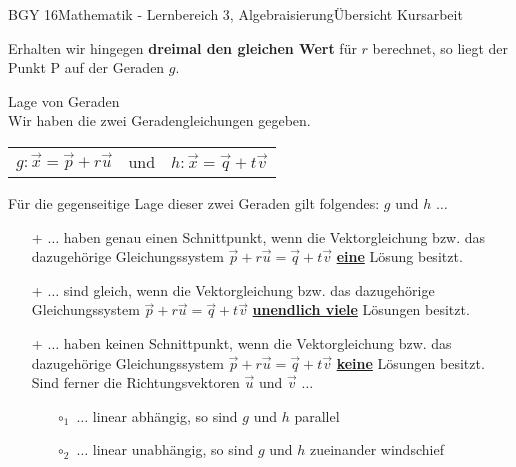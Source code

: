 \documentclass[oneside,openany,headings=optiontotoc,11pt,numbers=noenddot]{scrreprt}
\begin{document}
\begin{worksheet}{BGY 16}{Mathematik - Lernbereich 3, Algebraisierung}{Übersicht Kursarbeit}
\begin{framed}
			Erhalten wir hingegen \textbf{dreimal den gleichen Wert} für \(r\) berechnet, so liegt der Punkt P auf der Geraden \(g\).
		\end{framed}
		\begin{framed}
			\noindent
			\tiny{\color{codegray}Lage von Geraden}\normalcolor\normalsize\\
			Wir haben die zwei Geradengleichungen gegeben.
			\begin{center}
				\begin{tabularx}{\textwidth}{XlX}
					\(g: \vec{x} = \vec{p} + r\vec{u}\) & und & \(h: \vec{x} = \vec{q} + t\vec{v}\)
				\end{tabularx}
			\end{center}
			Für die gegenseitige Lage dieser zwei Geraden gilt folgendes: \(g\) und \(h\) \(\ldots\)
			\begin{framed}
				\noindent
				\begin{itemize}
					\item[+] \(\ldots\) haben \color{codegreen}genau einen\normalcolor{} Schnittpunkt, wenn die Vektorgleichung bzw. das dazugehörige Gleichungssystem \(\vec{p} + r\vec{u} = \vec{q} + t\vec{v}\) \underline{\textbf{eine}} Lösung besitzt. 
					\item[+] \(\ldots\) sind \color{codegreen}gleich\normalcolor{}, wenn die Vektorgleichung bzw. das dazugehörige Gleichungssystem \(\vec{p} + r\vec{u} = \vec{q} + t\vec{v}\) \underline{\textbf{unendlich viele}} Lösungen besitzt.
				\end{itemize}
			\end{framed}
			\begin{framed}
				\begin{itemize}
					\item[+] \(\ldots\) haben \color{red}keinen\normalcolor{} Schnittpunkt, wenn die Vektorgleichung bzw. das dazugehörige Gleichungssystem \(\vec{p} + r\vec{u} = \vec{q} + t\vec{v}\) \underline{\textbf{keine}} Lösungen besitzt.\\
					Sind ferner die Richtungsvektoren \(\vec{u}\) und \(\vec{v}\) \(\ldots\)
					\begin{itemize}
						\item[\(\circ_1\)] \(\ldots\) linear \color{blue}abhängig\normalcolor{}, so sind \(g\) und \(h\) \color{red}parallel\normalcolor{}
						\item[\(\circ_2\)] \(\ldots\) linear \color{blue}unabhängig\normalcolor{}, so sind \(g\) und \(h\) zueinander \color{red}windschief\normalcolor{}
					\end{itemize}

\end{itemize}
\end{framed}
\end{framed}
\end{worksheet}
\end{document}
